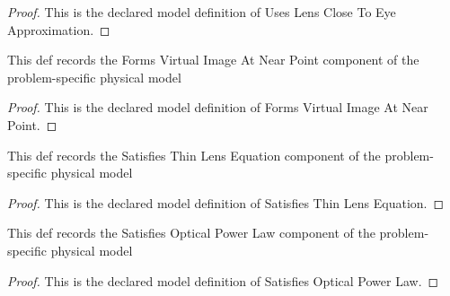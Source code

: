 \begin{proof}
  This is the declared model definition of Uses Lens Close To Eye Approximation.
\end{proof}
\begin{definition}
  \label{def:physics:phyx-mini-0129:phyxminiproblems-problemphyxmini0129-formsvirtualimageatnearpoint}
  This def records the Forms Virtual Image At Near Point component of the problem-specific physical model
\end{definition}
\begin{proof}
  This is the declared model definition of Forms Virtual Image At Near Point.
\end{proof}
\begin{definition}
  \label{def:physics:phyx-mini-0129:phyxminiproblems-problemphyxmini0129-satisfiesthinlensequation}
  This def records the Satisfies Thin Lens Equation component of the problem-specific physical model
\end{definition}
\begin{proof}
  This is the declared model definition of Satisfies Thin Lens Equation.
\end{proof}
\begin{definition}
  \label{def:physics:phyx-mini-0129:phyxminiproblems-problemphyxmini0129-satisfiesopticalpowerlaw}
  This def records the Satisfies Optical Power Law component of the problem-specific physical model
\end{definition}
\begin{proof}
  This is the declared model definition of Satisfies Optical Power Law.
\end{proof}
